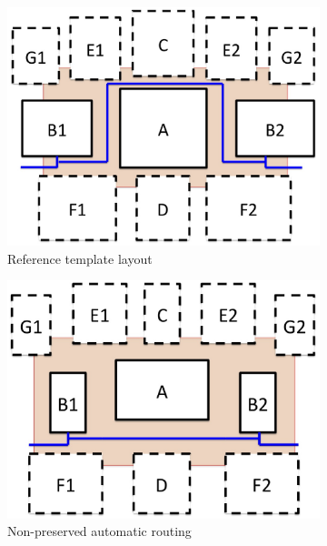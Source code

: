       \begin{figure}
        \centering
        \begin{subfigure}[t]{0.4\textwidth}
        \includegraphics[width=\textwidth]{Fig/RoutingPreserv_a.eps}
        \caption{Reference template layout}
        \label{fig:RoutingPreserv_A}
        \end{subfigure}
        \begin{subfigure}[t]{0.4\textwidth}
        \includegraphics[width=\textwidth]{Fig/RoutingPreserv_b.eps}
        \caption{Non-preserved automatic routing}
        \label{fig:RoutingPreserv_B}
        \end{subfigure}
        \begin{subfigure}[t]{0.4\textwidth}

\end{subfigure}
\end{figure}
